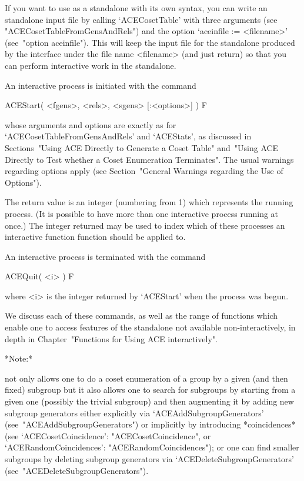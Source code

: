 \enditems


If you want to use {\ACE} as a standalone with its own syntax, you can
write an {\ACE} standalone input file by calling `ACECosetTable'  with
three arguments (see "ACECosetTableFromGensAndRels")  and  the  option
`aceinfile := <filename>' (see~"option aceinfile"). This will keep the
input file for the {\ACE} standalone produced by the {\GAP}  interface
under the file name <filename> (and  just  return)  so  that  you  can
perform interactive work in the standalone.


\beginitems

An interactive {\ACE} process is initiated with the command

\>ACEStart( <fgens>, <rels>, <sgens> [:<options>] ) F

whose    arguments    and    options    are     exactly     as     for
`ACECosetTableFromGensAndRels'  and  `ACEStats',   as   discussed   in
Sections~"Using ACE Directly to Generate a Coset Table" and~"Using ACE
Directly to Test whether a Coset Enumeration  Terminates".  The  usual
warnings  regarding  options  apply  (see  Section~"General   Warnings
regarding the Use of Options").

The return value is an integer (numbering from 1) which represents the
running process. (It is possible to have  more  than  one  interactive
process running at once.) The integer returned may be  used  to  index
which of these  processes  an  interactive  function  {\ACE}  function
should be applied to.

An interactive{\ACE} process is terminated with the command

\>ACEQuit( <i> ) F

where <i> is the integer returned by `ACEStart' when the  process  was
begun.

We discuss each of these commands, as well as the range  of  functions
which enable one to access  features  of  the  {\ACE}  standalone  not
available non-interactively, in depth in Chapter~"Functions for  Using
ACE interactively".

\enditems

*Note:*

{\ACE} not only allows one to do a coset enumeration of a group  by  a
given (and then fixed) subgroup but it also allows one to  search  for
subgroups by starting from a given one (possibly the trivial subgroup)
and then augmenting  it  by  adding  new  subgroup  generators  either
explicitly               via                `ACEAddSubgroupGenerators'
(see~"ACEAddSubgroupGenerators")   or   implicitly   by    introducing
*coincidences*     (see     `ACECosetCoincidence':
"ACECosetCoincidence",           or           `ACERandomCoincidences':
"ACERandomCoincidences");  or  one  can  find  smaller  subgroups   by
deleting   subgroup   generators   via   `ACEDeleteSubgroupGenerators'
(see~"ACEDeleteSubgroupGenerators").

